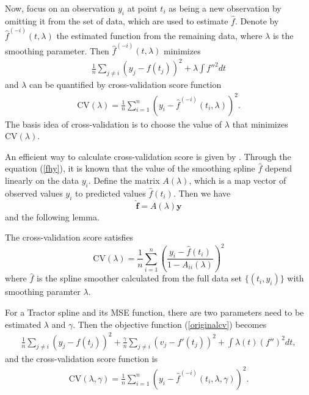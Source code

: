 Now, focus on an observation $y_i$ at point $t_i$ as being a new observation by omitting it from the set of data, which are used to estimate $\hat{f}$. Denote by $\hat{f}^{(-i)}(t,\lambda)$ the estimated function from the remaining data, where $\lambda$ is the smoothing parameter. Then $\hat{f}^{(-i)}(t,\lambda)$ minimizes 
\begin{align}\label{originalcv}
\frac{1}{n}\sum_{j \neq i}(y_j-f(t_j))^2+\lambda \int f''^2dt
\end{align}
 and $\lambda$ can be quantified by cross-validation score function
\begin{align}
\mbox{CV}(\lambda)=\frac{1}{n}\sum_{i=1}^{n}\left(  y_i-\hat{f}^{(-i)}(t_i,\lambda)\right) ^2.
\end{align}
The basis idea of cross-validation is to choose the value of $\lambda$ that minimizes $\mbox{CV}(\lambda)$. 

An efficient way to calculate cross-validation score is given by \cite{green1993nonparametric}. Through the equation (\ref{fhy}), it is known that the value of the smoothing spline $\hat{f}$ depend linearly on the data $y_i$. Define the matrix $A(\lambda)$, which is a map vector of observed values $y_i$ to predicted values $\hat{f}(t_i)$. Then we have
\begin{equation}\label{crossvalidationmatrixA}
\hat{\mathbf{f}}=A(\lambda)\mathbf{y}
\end{equation}
and the following lemma.
\begin{lemma}\label{cvlema}
The cross-validation score satisfies
\begin{equation}
\mbox{CV}(\lambda)=\frac{1}{n} \sum_{i=1}^n \left(\frac{y_i-\hat{f}(t_i)}{1-A_{ii}(\lambda)}\right)^2
\end{equation}
where $\hat{f}$ is the spline smoother calculated from the full data set $\{(t_i,y_i)\}$ with smoothing paramter $\lambda$.
\end{lemma}

For a Tractor spline and its MSE function, there are two parameters need to be estimated $\lambda$ and $\gamma$. Then the objective function (\ref{originalcv}) becomes
\begin{align}
\frac{1}{n}\sum_{j \neq i}\left( y_j-f(t_j) \right)^2+\frac{\gamma}{n}\sum_{j \neq i} \left( v_j-f'(t_j) \right)^2+ \int \lambda(t) \left( f'' \right)^2dt,
\end{align}
and the cross-validation score function is
\begin{align}
\mbox{CV}(\lambda,\gamma)=\frac{1}{n}\sum_{i=1}^{n}\left( y_i-\hat{f}^{(-i)}(t_i,\lambda,\gamma) \right) ^2.
\end{align}

